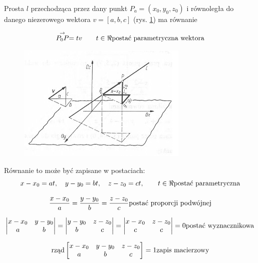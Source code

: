 \begin{pkt}{30.1}
Prosta $l$ przechodząca przez dany punkt $P_a = (x_0,y_0,z_0)$ i równoległa do danego niezerowego wektora $v = [a,b,c]$ (rys. \ref{fig:30.1}) ma równanie

\begin{equation}
	\stackrel{\rightarrow}{P_0P} = tv \qquad t \in \Re \hfill \textrm{postać parametryczna wektora}
	\label{eq30.1}
\end{equation}


\begin{figure}[ht]
	\centering
		\includegraphics{rys/30_1.png}
	\caption{ }
	\label{fig:30.1}
\end{figure}
Równanie to może być zapisane w postaciach:%
\begin{equation}
	x - x_0 = at, \quad y - y_0 = bt, \quad z - z_0 = ct, \qquad t \in \Re  \hfill \textrm{postać parametryczna}
	\label{eq30.2}
\end{equation}

\begin{equation}
	\frac{x - x_0}{a} = \frac{y - y_0}{b} = \frac{z - z_0}{c} \hfill \textrm{postać proporcji podwójnej}
	\label{eq30.3}
\end{equation}

\begin{equation}
	\begin{vmatrix}
		x - x_0 & y-y_0\\
		a & b
	\end{vmatrix}
	=
	\begin{vmatrix}
		y - y_0 & z - z_0\\
		b & c
	\end{vmatrix}
	=
	\begin{vmatrix}
		x - x_0 & z - z_0\\
		c & c
	\end{vmatrix}
	= 0 \hfill	\textrm{postać wyznacznikowa}
	\label{eq30.4}
\end{equation}

\begin{equation}
	\text{rząd} 
	\begin{bmatrix}
		x - x_0 & y - y_0 & z - z_0\\
		a & b & c
	\end{bmatrix}
	= 1	\hfill \textrm{zapis macierzowy}
	\label{eq30.5}
\end{equation}
\end{pkt}
